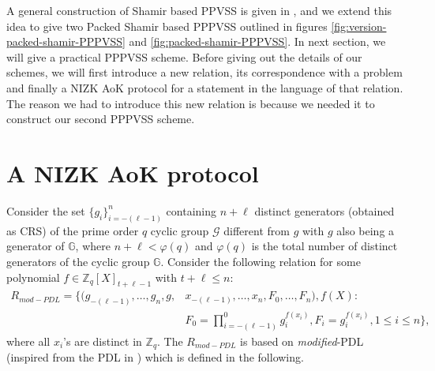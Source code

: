 A general construction of Shamir based PPVSS is given in \cite{cryptoeprint:2025/576}, and we extend this idea 
to give two Packed Shamir based PPPVSS outlined in figures \ref{fig:version-packed-shamir-PPPVSS} and \ref{fig:packed-shamir-PPPVSS}. 
In next section, we will give a practical PPPVSS scheme. Before giving out the details of our 
schemes, we will first introduce a new relation, its correspondence with a problem and finally 
a NIZK AoK protocol for a statement in the language of that relation. The reason we had to 
introduce this new relation is because we needed it to construct our second PPPVSS scheme. 




\section{A NIZK AoK protocol}
\label{sec:aok_polynomial_dl}
Consider the set $\{g_i\}_{i=-(\ell-1)}^n$ containing $n+\ell$ distinct generators (obtained as CRS) of 
the prime order $q$ cyclic group $\mathcal{G}$ different from $g$ with $g$ also being a generator of 
$\mathbb{G}$, where $n+\ell<\varphi(q)$ and $\varphi(q)$ is
the total number of distinct generators of the cyclic group $\mathbb{G}$. Consider the following relation for 
some polynomial $f\in\mathbb{Z}_q[X]_{t+\ell-1}$ with $t+\ell\leq n$:
\begin{align}\label{eq:relation_mod_PDL}
  R_{mod-PDL} = \{(g_{-(\ell-1)},\dots,g_n,g,&x_{-(\ell-1)},\dots,x_n,F_0,\dots,F_n),f(X) :\nonumber\\
   &F_0=\prod_{i=-(\ell-1)}^{0}g_i^{f(x_i)}, F_i=g_i^{f(x_i)}, 1\leq i\leq n\},
\end{align}
where all $x_i$'s are distinct in $\mathbb{Z}_q$. The $R_{mod-PDL}$ is based on \textit{modified}-PDL 
(inspired from the PDL in \cite{cryptoeprint:2023/1669}) which is defined in the following.


